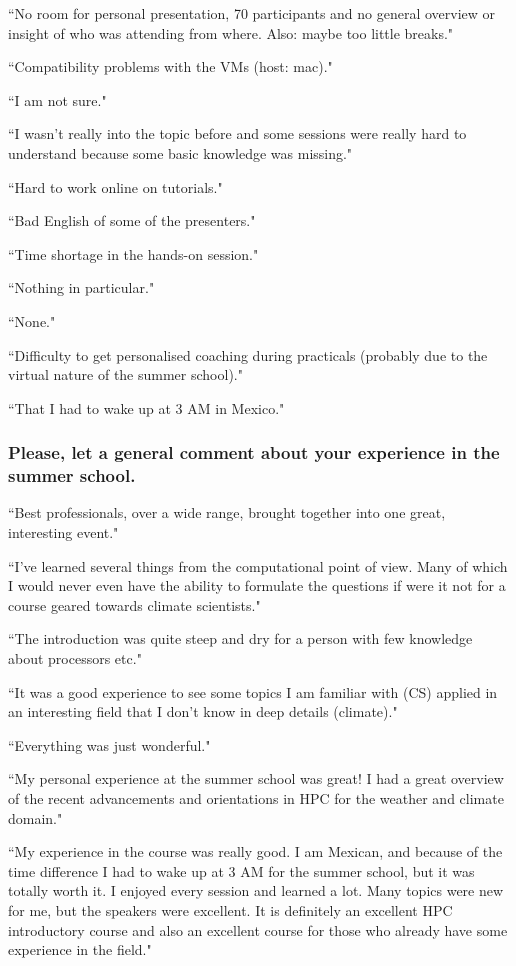 ``No room for personal presentation, 70 participants and no general overview or insight of who was attending from where. Also: maybe too little breaks."

``Compatibility problems with the VMs (host: mac)."

``I am not sure."

``I wasn't really into the topic before and some sessions were really hard to understand because some basic knowledge was missing."

``Hard to work online on tutorials."

``Bad English of some of the presenters."

``Time shortage in the hands-on session."

``Nothing in particular."

``None."

``Difficulty to get personalised coaching during practicals (probably due to the virtual nature of the summer school)."

``That I had to wake up at 3 AM in Mexico."

\subsubsection{Please, let a general comment about your experience in the summer school.}

``Best professionals, over a wide range, brought together into one great, interesting event."

``I've learned several things from the computational point of view. Many of which I would never even have the ability to formulate the questions if were it not for a course geared towards climate scientists."

``The introduction was quite steep and dry for a person with few knowledge about processors etc."

``It was a good experience to see some topics I am familiar with (CS) applied in an interesting field that I don't know in deep details (climate)."

``Everything was just wonderful."

``My personal experience at the summer school was great! I had a great overview of the recent advancements and orientations in HPC for the weather and climate domain."

``My experience in the course was really good. I am Mexican, and because of the time difference I had to wake up at 3 AM for the summer school, but it was totally worth it. I enjoyed every session and learned a lot. Many topics were new for me, but the speakers were excellent. It is definitely an excellent HPC introductory course and also an excellent course for those who already have some experience in the field."

